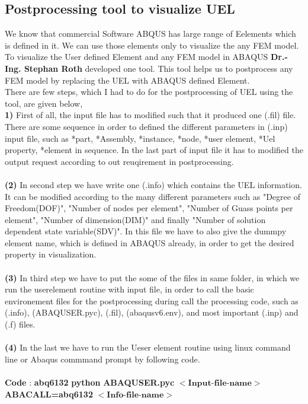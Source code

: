 \documentclass[12pt]{article}
\begin{document}
\begin{appendices}
\section{Postprocessing tool to visualize UEL}
We know that commercial Software ABQUS has large range of Eelements which is defined in it. We can use those elements only to visualize the any FEM model. To visualize the User defined Element and any FEM model in ABAQUS \textbf{Dr.-Ing. Stephan Roth} developed one tool. This tool helps us to postprocess any FEM model by replacing the UEL with ABAQUS defined Element.
\\
\newline
There are few steps, which I had to do for the postprocessing of UEL using the tool, are given below,
\newline
\\
\textbf{1)} First of all, the input file has to modified such that it produced one (.fil) file. There are some sequence in order to defined the different parameters in (.inp) input file, such as *part, *Assembly, *instance, *node, *user element, *Uel property, *element in sequence.
In the last part of input file it has to modified the output request according to out reuqirement in postprocessing.
\\
\\
\textbf{(2)} In second step we have write one (.info) which contains the UEL information. It can be modified according to the many different parameters such as "Degree of Freedom(DOF)", "Number of nodes per element", "Number of Guass points per element", "Number of dimension(DIM)" and finally "Number of solution dependent state variable(SDV)". In this file we have to also give the dummpy element name, which is defined in ABAQUS already, in order to get the desired property in visualization. 
\\
\\
\textbf{(3)} In third step we have to put the some of the files in same folder, in which we run the userelement routine with input file, in order to call the basic environement files for the postprocessing during call the processing code, such as (.info), (ABAQUSER.pyc), (.fil), (abaqusv6.env), and most important (.inp) and (.f) files.
\\
\\
\textbf{(4)} In the last we have to run the Ueser element routine using linux command line or Abaqus commmand prompt by following code.
\\
\\
\textbf{Code} : \textbf{abq6132} \textbf{python} \textbf{ABAQUSER.pyc} $<\textbf{Input-file-name}>$ \\
\textbf{ABACALL=abq6132} $<\textbf{Info-file-name}>$


\end{appendices}





















\newpage


\end{document}
